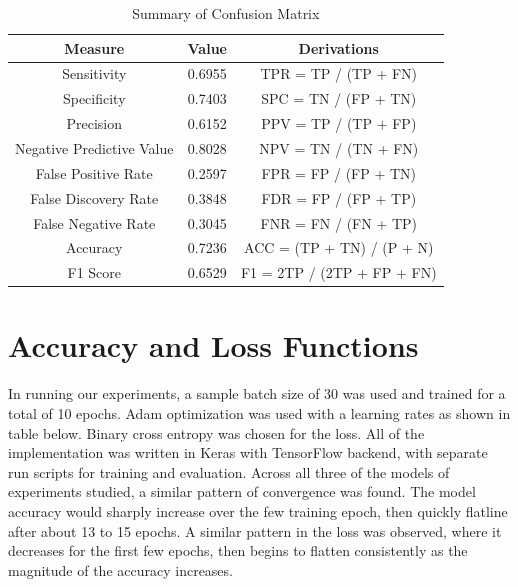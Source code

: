 \begin{table}[tbh]
\begin{center}
\begin{tabular}{|c|c|c|}
\hline
\textbf{Measure}          & \textbf{Value} & \textbf{Derivations}       \\ \hline
Sensitivity               & 0.6955         & TPR = TP / (TP + FN)       \\ \hline
Specificity               & 0.7403         & SPC = TN / (FP + TN)       \\ \hline
Precision                 & 0.6152         & PPV = TP / (TP + FP)       \\ \hline
Negative Predictive Value & 0.8028         & NPV = TN / (TN + FN)       \\ \hline
False Positive Rate       & 0.2597         & FPR = FP / (FP + TN)       \\ \hline
False Discovery Rate      & 0.3848         & FDR = FP / (FP + TP)       \\ \hline
False Negative Rate       & 0.3045         & FNR = FN / (FN + TP)       \\ \hline
Accuracy                  & 0.7236         & ACC = (TP + TN) / (P + N)  \\ \hline
F1 Score                  & 0.6529         & F1 = 2TP / (2TP + FP + FN) \\ \hline
\end{tabular}
\end{center}
\caption{Summary of Confusion Matrix}
\end{table}

\section{Accuracy and Loss Functions}
In running our experiments, a sample batch size of 30 was used and trained for a total of 10 epochs. Adam optimization was used with a learning rates as shown in table below. Binary cross entropy was chosen for the loss. All of the implementation was written in Keras with TensorFlow backend, with separate run scripts for training and evaluation. Across all three of the models of experiments studied, a similar pattern of convergence was found. The model accuracy would sharply increase over the few training epoch, then quickly flatline after about 13 to 15 epochs. A similar pattern in the loss was observed, where it decreases for the first few epochs, then begins to flatten consistently as the magnitude of the accuracy increases. 

